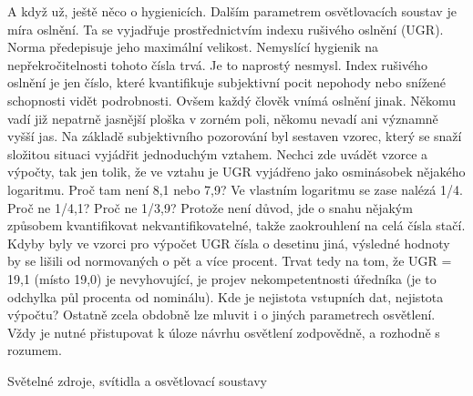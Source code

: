 A když už, ještě něco o hygienicích. Dalším parametrem osvětlovacích soustav je míra oslnění. Ta se vyjadřuje prostřednictvím indexu rušivého oslnění (UGR). Norma předepisuje jeho maximální velikost. Nemyslící hygienik na nepřekročitelnosti tohoto čísla trvá. Je to naprostý nesmysl. Index rušivého oslnění je jen číslo, které kvantifikuje subjektivní pocit nepohody nebo snížené schopnosti vidět podrobnosti. Ovšem každý člověk vnímá oslnění jinak. Někomu vadí již nepatrně jasnější ploška v zorném poli, někomu nevadí ani významně vyšší jas. Na základě subjektivního pozorování byl sestaven vzorec, který se snaží složitou situaci vyjádřit jednoduchým vztahem. Nechci zde uvádět vzorce a výpočty, tak jen tolik, že ve vztahu je UGR vyjádřeno jako osminásobek nějakého logaritmu. Proč tam není 8,1 nebo 7,9? Ve vlastním logaritmu se zase nalézá 1/4. Proč ne 1/4,1? Proč ne 1/3,9? Protože není důvod, jde o snahu nějakým způsobem kvantifikovat nekvantifikovatelné, takže zaokrouhlení na celá čísla stačí. Kdyby byly ve vzorci pro výpočet UGR čísla o desetinu jiná, výsledné hodnoty by se lišili od normovaných o pět a více procent. Trvat tedy na tom, že UGR = 19,1 (místo 19,0) je nevyhovující, je projev nekompetentnosti úředníka (je to odchylka půl procenta od nominálu). Kde je nejistota vstupních dat, nejistota výpočtu? Ostatně zcela obdobně lze mluvit i o jiných parametrech osvětlení. Vždy je nutné přistupovat k úloze návrhu osvětlení zodpovědně, a rozhodně s rozumem.

\sec Světelné zdroje, svítidla a osvětlovací soustavy

